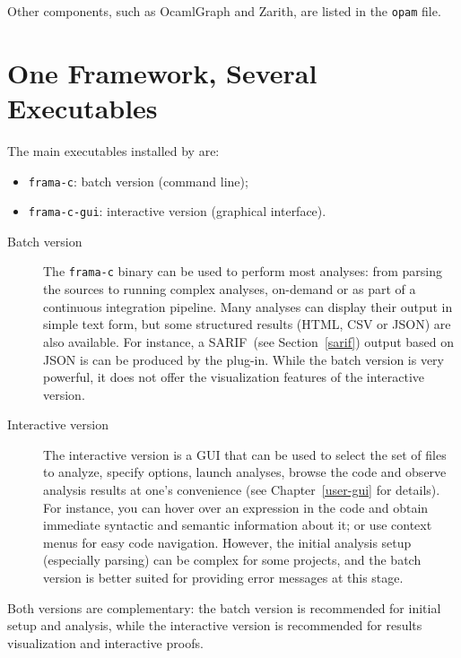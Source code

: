 Other components, such as OcamlGraph and Zarith, are listed in the
\texttt{opam} file.

\section{One Framework, Several Executables}\label{sec:modes}

The main executables installed by \FramaC are:

\begin{itemize}
\item \texttt{frama-c}: batch version (command line);
\item \texttt{frama-c-gui}: interactive version (graphical interface).
\end{itemize}

\begin{description}
\item[Batch version]

  The \texttt{frama-c} binary can be used to perform most \FramaC analyses:
  from parsing the sources to running complex analyses, on-demand or as part
  of a continuous integration pipeline. Many analyses can display their output
  in simple text form, but some structured results (HTML, CSV or JSON) are
  also available. For instance, a SARIF~(see Section~\ref{sarif}) output
  based on JSON is can be produced by the  plug-in.
  While the batch version is very powerful, it does not offer the visualization
  features of the interactive version.

\item[Interactive version]
  The interactive version is a GUI that can be used to select the set of files
  to analyze, specify options, launch analyses, browse the code and observe
  analysis results at one's convenience (see Chapter~\ref{user-gui} for
  details). For instance, you can hover over an expression in the code and
  obtain immediate syntactic and semantic information about it; or use context
  menus for easy code navigation.
  However, the initial analysis setup (especially parsing) can be complex for
  some projects, and the batch version is better suited for providing error
  messages at this stage.

\end{description}

Both versions are complementary: the batch version is recommended
for initial setup and analysis, while the interactive version is recommended for
results visualization and interactive proofs.

